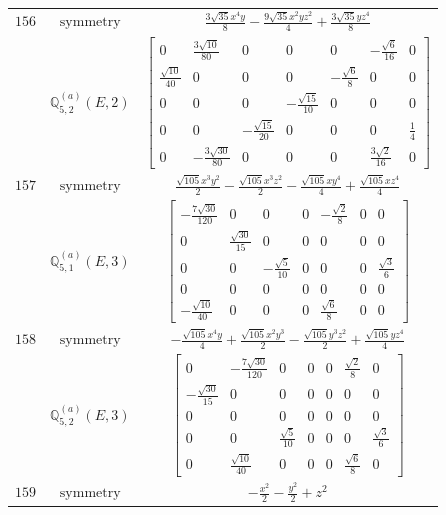 \documentclass[fleqn,8pt,landscape]{jsarticle}
\begin{document}
\begin{longtable}{ccc}
$ 156 $ & $ \text{symmetry} $ & $ \frac{3 \sqrt{35} x^{4} y}{8} - \frac{9 \sqrt{35} x^{2} y z^{2}}{4} + \frac{3 \sqrt{35} y z^{4}}{8} $ \\
$  $ & $ \mathbb{Q}_{5,2}^{(a)}(E,2) $ & $ \begin{bmatrix} 0 & \frac{3 \sqrt{10}}{80} & 0 & 0 & 0 & - \frac{\sqrt{6}}{16} & 0 \\ \frac{\sqrt{10}}{40} & 0 & 0 & 0 & - \frac{\sqrt{6}}{8} & 0 & 0 \\ 0 & 0 & 0 & - \frac{\sqrt{15}}{10} & 0 & 0 & 0 \\ 0 & 0 & - \frac{\sqrt{15}}{20} & 0 & 0 & 0 & \frac{1}{4} \\ 0 & - \frac{3 \sqrt{30}}{80} & 0 & 0 & 0 & \frac{3 \sqrt{2}}{16} & 0 \end{bmatrix} $ \\ \hline
$ 157 $ & $ \text{symmetry} $ & $ \frac{\sqrt{105} x^{3} y^{2}}{2} - \frac{\sqrt{105} x^{3} z^{2}}{2} - \frac{\sqrt{105} x y^{4}}{4} + \frac{\sqrt{105} x z^{4}}{4} $ \\
$  $ & $ \mathbb{Q}_{5,1}^{(a)}(E,3) $ & $ \begin{bmatrix} - \frac{7 \sqrt{30}}{120} & 0 & 0 & 0 & - \frac{\sqrt{2}}{8} & 0 & 0 \\ 0 & \frac{\sqrt{30}}{15} & 0 & 0 & 0 & 0 & 0 \\ 0 & 0 & - \frac{\sqrt{5}}{10} & 0 & 0 & 0 & \frac{\sqrt{3}}{6} \\ 0 & 0 & 0 & 0 & 0 & 0 & 0 \\ - \frac{\sqrt{10}}{40} & 0 & 0 & 0 & \frac{\sqrt{6}}{8} & 0 & 0 \end{bmatrix} $ \\ \hline
$ 158 $ & $ \text{symmetry} $ & $ - \frac{\sqrt{105} x^{4} y}{4} + \frac{\sqrt{105} x^{2} y^{3}}{2} - \frac{\sqrt{105} y^{3} z^{2}}{2} + \frac{\sqrt{105} y z^{4}}{4} $ \\
$  $ & $ \mathbb{Q}_{5,2}^{(a)}(E,3) $ & $ \begin{bmatrix} 0 & - \frac{7 \sqrt{30}}{120} & 0 & 0 & 0 & \frac{\sqrt{2}}{8} & 0 \\ - \frac{\sqrt{30}}{15} & 0 & 0 & 0 & 0 & 0 & 0 \\ 0 & 0 & 0 & 0 & 0 & 0 & 0 \\ 0 & 0 & \frac{\sqrt{5}}{10} & 0 & 0 & 0 & \frac{\sqrt{3}}{6} \\ 0 & \frac{\sqrt{10}}{40} & 0 & 0 & 0 & \frac{\sqrt{6}}{8} & 0 \end{bmatrix} $ \\ \hline
$ 159 $ & $ \text{symmetry} $ & $ - \frac{x^{2}}{2} - \frac{y^{2}}{2} + z^{2} $ \\

\end{longtable}
\end{document}
